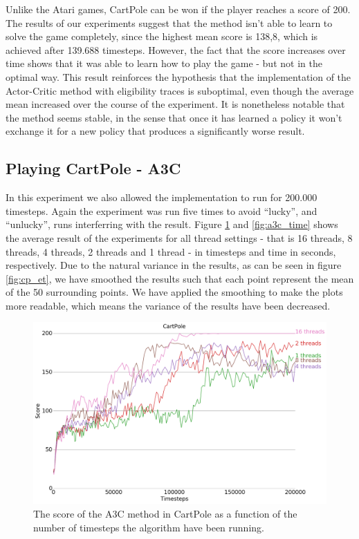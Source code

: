 \documentclass[11pt]{article}
\begin{document}
Unlike the Atari games, CartPole can be won if the player reaches a score of 200.
The results of our experiments suggest that
the method isn't able to learn to solve the game completely,
since the highest mean score is 138,8, which is achieved after 139.688 timesteps.
However, the fact that the score increases over time
shows that it was able to learn how to play the game -
but not in the optimal way.
This result reinforces the hypothesis that the implementation of the
Actor-Critic method with eligibility traces is suboptimal, even
though the average mean increased over the course of the experiment.
It is nonetheless notable that the method seems stable, in the sense that once it has learned
a policy it won't exchange it for a new policy that produces a significantly worse result.


\subsection{Playing CartPole - A3C}

In this experiment we also allowed the implementation to run for
200.000 timesteps.
Again the experiment was run five times to avoid “lucky”, and “unlucky”, runs
interferring with the result. 
Figure \ref{fig:a3c_time_steps} and \ref{fig:a3c_time} shows the average result of the experiments for all thread settings - that is 16 threads, 8 threads, 4 threads,
2 threads and 1 thread - in timesteps and time in seconds, respectively.
Due to the natural variance in the results, as can be seen in figure \ref{fig:cp_et},
we have smoothed the results such that each point represent the mean of the 50
surrounding points.
We have applied the smoothing to make the plots more readable,
which means the variance of the results have been decreased.

\begin{figure}[H]
    \centering
    \includegraphics[scale=0.4]{plots/cartpole_compare_counter_without_AC.png}
    \caption{The score of the A3C method in CartPole as a function
    of the number of timesteps the algorithm have been running.}
    \label{fig:a3c_time_steps}
\end{figure}
\end{document}
